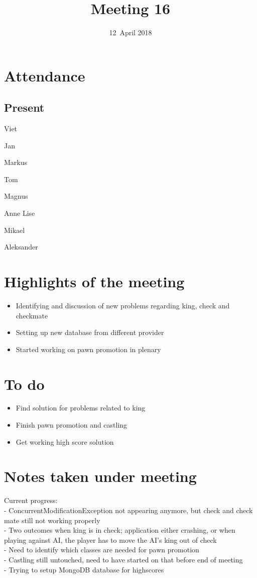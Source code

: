 \documentclass[letterpaper,11pt]{article}
\title{Meeting 16}
\date{12~April 2018}
\begin{document}
\maketitle
\section*{Attendance}
\subsection*{Present}
\begin{list}{}{}
	\item Viet
	\item Jan
	\item Markus
	\item Tom
	\item Magnus
	\item Anne Lise
	\item Mikael
	\item Aleksander
\end{list}

\newpage
\section*{Highlights of the meeting}
\begin{itemize}
	\item Identifying and discussion of new problems regarding king, check and checkmate
	\item Setting up new database from different provider
	\item Started working on pawn promotion in plenary
\end{itemize}

\section*{To do}
\begin{itemize}
	\item Find solution for problems related to king
	\item Finish pawn promotion and castling
	\item Get working high score solution
\end{itemize}

\section*{Notes taken under meeting}
Current progress:\\
- ConcurrentModificationException not appearing anymore, but check and check mate still not working properly\\
- Two outcomes when king is in check; application either crashing, or when playing against AI, the player has to move the AI's king out of check\\
- Need to identify which classes are needed for pawn promotion\\
- Castling still untouched, need to have started on that before end of meeting\\
- Trying to setup MongoDB database for highscores\\
\end{document}
